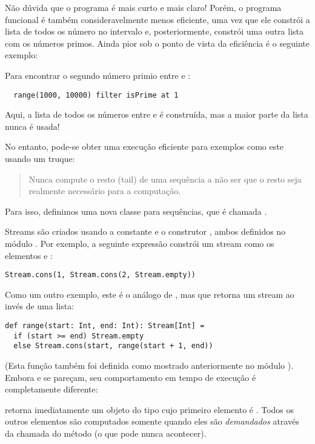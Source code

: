 Não dúvida que o programa é mais curto e mais claro! Porém, o 
programa funcional é também consideravelmente menos eficiente, uma
vez que ele constrói a lista de todos os número no intervalo e, posteriormente,
constrói uma outra lista com os números primos. Ainda pior sob o ponto de vista
da eficiência é o seguinte exemplo:

Para encontrar o segundo número primio entre  e :
\begin{lstlisting}
  range(1000, 10000) filter isPrime at 1
\end{lstlisting}
Aqui, a lista de todos os números entre  e  é construída,
mas a maior parte da lista nunca é usada!

No entanto, pode-se obter uma execução eficiente para exemplos como este usando
um truque:
\begin{quote}
 Nunca compute o resto (tail) de uma sequência a não ser que o resto seja realmente
necessário para a computação.
\end{quote}
Para isso, definimos uma nova classe para sequências, que é chamada .

Streams são criados usando a constante   e o construtor ,
ambos definidos no módulo . Por exemplo, a seguinte expressão constrói
um stream como os elementos  e :
\begin{lstlisting}
Stream.cons(1, Stream.cons(2, Stream.empty))
\end{lstlisting}
Como um outro exemplo, este é o análogo de ,
mas que retorna um stream ao invés de uma lista:
\begin{lstlisting}
def range(start: Int, end: Int): Stream[Int] =
  if (start >= end) Stream.empty
  else Stream.cons(start, range(start + 1, end))
\end{lstlisting}
(Esta função também foi definida como mostrado anteriormente no módulo 
).  Embora  e  se pareçam,
seu comportamento em tempo de execução é completamente diferente: 

 retorna imediatamente um objeto do tipo  cujo primeiro
elemento é .  Todos os outros elementos são computados somente quando eles são 
\emph{demandados} através da chamada do método  (o que pode nunca acontecer).  

